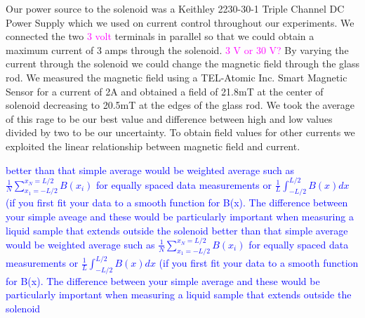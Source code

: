 \documentclass[prb,preprint]{revtex4-1}
\begin{document}
Our power source to the solenoid was a Keithley 2230-30-1 Triple Channel DC Power Supply which we used on current control throughout our experiments. We connected the two \textcolor{magenta}{3 volt}  terminals in parallel so that we could obtain a maximum current of 3 amps through the solenoid. \textcolor{magenta}{3 V or 30 V?} By varying the current through the solenoid we could change the magnetic field through the glass rod. We measured the magnetic field using a TEL-Atomic Inc. Smart Magnetic Sensor for a current of 2A and obtained a field of 21.8mT at the center of solenoid decreasing to 20.5mT at the edges of the glass rod. We took the average of this rage to be our best value and difference between high and low values divided by two to be our uncertainty. To obtain field values for other currents we exploited the linear relationship between magnetic field and current.

\textcolor{blue}{better than that simple average would be weighted average such as $\frac{1}{N} \sum_{x_1=-L/2}^{x_N = L/2}B(x_i)$  for equally spaced data measurements or  $\frac{1}{L} \int_{-L/2}^{L/2}B(x)dx$ (if you first fit your data to a smooth function for B(x). The difference between your simple aveage and these would be particularly important when measuring a liquid sample that extends outside the solenoid}
\textcolor{blue}{better than that simple average would be weighted average such as $\frac{1}{N} \sum_{x_1=-L/2}^{x_N = L/2}B(x_i)$  for equally spaced data measurements or  $\frac{1}{L} \int_{-L/2}^{L/2}B(x)dx$ (if you first fit your data to a smooth function for B(x). The difference between your simple average and these would be particularly important when measuring a liquid sample that extends outside the solenoid}
\end{document}
